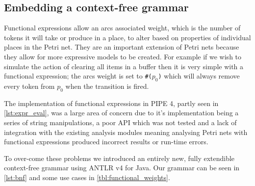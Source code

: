 \subsection{Embedding a context-free grammar}
Functional expressions allow an arcs associated weight, which is the number of tokens it will take or produce in a place, to alter based on properties of individual places in the Petri net. They are an important extension of Petri nets because they allow for more expressive models to be created. For example if we wish to simulate the action of clearing all items in a buffer then it is very simple with a functional expression; the arcs weight is set to \texttt{\#($p_0$)} which will always remove every token from $p_0$ when the transition is fired.

The implementation of functional expressions in PIPE 4, partly seen in \cref{lst:expr_eval}, was a large area of concern due to it's implementation being a series of string manipulations, a poor API which was not tested and a lack of integration with the existing analysis modules meaning analysing Petri nets with functional expressions produced incorrect results or run-time errors.


To over-come these problems we introduced an entirely new, fully extendible context-free grammar using ANTLR v4 for Java. Our grammar can be seen in \cref{lst:bnf} and some use cases in \cref{tbl:functional_weights}.


